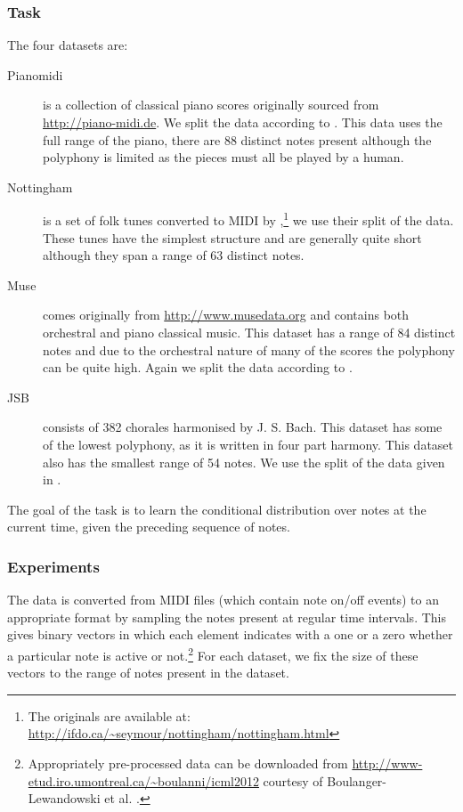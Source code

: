 \subsubsection{Task}
The four datasets are:
\begin{description}
\item[Pianomidi] {
	is a collection of classical piano scores originally sourced from
	\url{http://piano-midi.de}. We split the data according to
	\autocite{Poliner2007}. This data uses the full range of the piano,
	there are 88 distinct notes present although the polyphony is limited
	as the pieces must all be played by a human.}
\item[Nottingham] {
	is a set of folk tunes converted to MIDI by 
	\autocite{Boulanger-Lewandowski2012},\footnote{
	The originals are available at: \url{http://ifdo.ca/~seymour/nottingham/nottingham.html}}
	we use their split of the data. These tunes have the simplest structure and are
	generally quite short although they span a range of 63 distinct notes.}
\item[Muse] {
	comes originally from \url{http://www.musedata.org} and contains both orchestral and
	piano classical music. This dataset has a range of 84 distinct notes and due to the
	orchestral nature of many of the scores the polyphony can be quite high. Again we
	split the data according to \autocite{Boulanger-Lewandowski2012}.}
\item[JSB] {
	consists of 382 chorales harmonised by J. S. Bach. This dataset has some of the
	lowest polyphony, as it is written in four part harmony.
	This dataset also has the smallest range of 54 notes.
	We use the split of the data given in \autocite{Allan2004}.}
\end{description} The goal of the task is to learn the conditional
distribution over notes at the current time, given the preceding sequence of notes.


\subsubsection{Experiments}
The data is converted from MIDI files (which contain note on/off events) to
an appropriate format by sampling the notes present at regular time intervals.
This gives binary vectors in which each element indicates with a one or a zero whether
a particular note is active or not.\footnote{Appropriately pre-processed data can
be downloaded from \url{http://www-etud.iro.umontreal.ca/~boulanni/icml2012}
courtesy of Boulanger-Lewandowski et al. \autocite{Boulanger-Lewandowski2012}.}
For each dataset, we fix the size of these vectors to the range of notes present in the
dataset.

